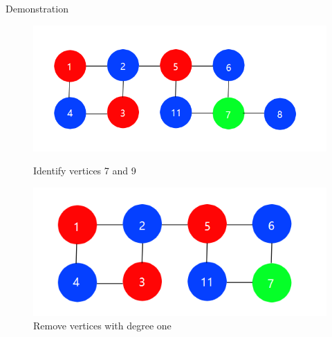 \documentclass{beamer}
\begin{document}
\begin{frame}{Demonstration}
\begin{figure}[htbp]
\centering
\begin{minipage}[t]{0.5\textwidth}
\centering
\includegraphics[width=1\textwidth]{figure/3.png}
\caption{Identify vertices 7 and 9}
\end{minipage}
\begin{minipage}[t]{0.48\textwidth}
\centering
\includegraphics[width=1\textwidth]{figure/4.png}
\caption{Remove vertices with degree one}
\end{minipage}
\end{figure}
\end{frame}
\end{document}
